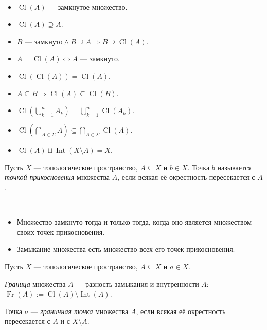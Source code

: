 \documentclass[12pt,a4paper]{article}
\DeclareMathOperator{\Int}{Int}
\DeclareMathOperator{\Cl}{Cl}
\DeclareMathOperator{\Fr}{Fr}
\begin{document}
    \begin{theorem}\ 
        \begin{itemize}
            \item $\Cl(A)$ --- замкнутое множество.
            \item $\Cl(A) \supseteq A$.
            \item $B\text{ --- замкнуто} \wedge B \supseteq A \Rightarrow B \supseteq \Cl(A)$.
            \item $A = \Cl(A) \Leftrightarrow A \text{ --- замкнуто}$.
            \item $\Cl(\Cl(A)) = \Cl(A)$.
            \item $A \subseteq B \Rightarrow \Cl(A) \subseteq \Cl(B)$.
            \item $\Cl(\bigcup_{k=1}^n A_k) = \bigcup_{k=1}^n \Cl(A_k)$.
            \item $\Cl(\bigcap_{A \in \Sigma} A) \subseteq \bigcap_{A \in \Sigma} \Cl(A)$.
            \item $\Cl(A) \sqcup \Int(X \setminus A) = X$.
        \end{itemize}
    \end{theorem}

    \begin{definition}
        Пусть $X$ --- топологическое пространство, $A \subseteq X$ и $b \in X$. Точка $b$ называется \emph{точкой прикосновения} множества $A$, если всякая её окрестность пересекается с $A$.
    \end{definition}

    \begin{theorem}\ 
        \begin{itemize}
            \item Множество замкнуто тогда и только тогда, когда оно является множеством своих точек прикосновения.
            \item Замыкание множества есть множество всех его точек прикосновения.
        \end{itemize}
    \end{theorem}

    \begin{definition}
        Пусть $X$ --- топологическое пространство, $A \subseteq X$ и $a \in X$.

        \emph{Граница} множества $A$ --- разность замыкания и внутренности $A$: $\Fr(A) := \Cl(A) \setminus \Int(A)$.

        Точка $a$ --- \emph{граничная точка} множества $A$, если всякая её окрестность пересекается с $A$ и с $X \setminus A$.
    \end{definition}
\end{document}
